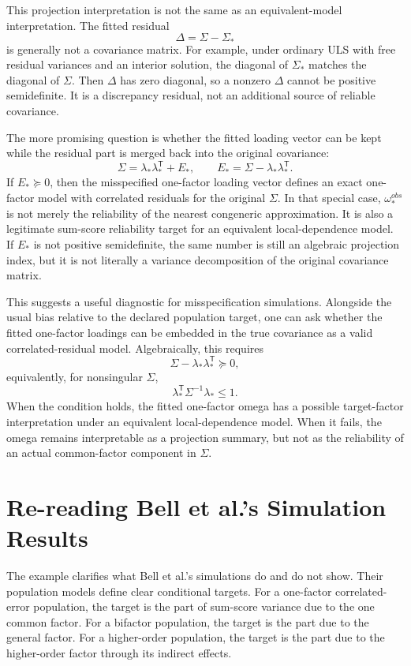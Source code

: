 \documentclass[11pt]{article}
\newcommand{\T}{^{\mathsf T}}
\begin{document}
This projection interpretation is not the same as an equivalent-model
interpretation. The fitted residual
\[
  \Delta=\Sigma-\Sigma_\ast
\]
is generally not a covariance matrix. For example, under ordinary ULS with free
residual variances and an interior solution, the diagonal of \(\Sigma_\ast\)
matches the diagonal of \(\Sigma\). Then \(\Delta\) has zero diagonal, so a
nonzero \(\Delta\) cannot be positive semidefinite. It is a discrepancy
residual, not an additional source of reliable covariance.

The more promising question is whether the fitted loading vector can be kept
while the residual part is merged back into the original covariance:
\[
  \Sigma
  =
  \lambda_\ast\lambda_\ast\T
  +
  E_\ast,
  \qquad
  E_\ast=\Sigma-\lambda_\ast\lambda_\ast\T .
\]
If \(E_\ast\succeq0\), then the misspecified one-factor loading vector defines
an exact one-factor model with correlated residuals for the original
\(\Sigma\). In that special case, \(\omega_\ast^{obs}\) is not merely the
reliability of the nearest congeneric approximation. It is also a legitimate
sum-score reliability target for an equivalent local-dependence model. If
\(E_\ast\) is not positive semidefinite, the same number is still an algebraic
projection index, but it is not literally a variance decomposition of the
original covariance matrix.

This suggests a useful diagnostic for misspecification simulations. Alongside
the usual bias relative to the declared population target, one can ask whether
the fitted one-factor loadings can be embedded in the true covariance as a
valid correlated-residual model. Algebraically, this requires
\[
  \Sigma-\lambda_\ast\lambda_\ast\T\succeq0,
\]
equivalently, for nonsingular \(\Sigma\),
\[
  \lambda_\ast\T\Sigma^{-1}\lambda_\ast\le 1 .
\]
When the condition holds, the fitted one-factor omega has a possible
target-factor interpretation under an equivalent local-dependence model. When
it fails, the omega remains interpretable as a projection summary, but not as
the reliability of an actual common-factor component in \(\Sigma\).

\section{Re-reading Bell et al.'s Simulation Results}

The example clarifies what Bell et al.'s \cite{bell2024} simulations do and do
not show. Their population models define clear conditional targets. For a
one-factor correlated-error population, the target is the part of sum-score
variance due to the one common factor. For a bifactor population, the target is
the part due to the general factor. For a higher-order population, the target is
the part due to the higher-order factor through its indirect effects.
\end{document}

